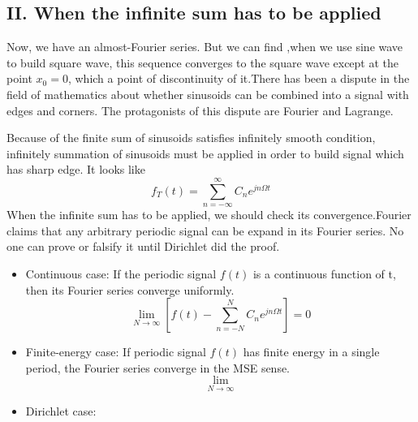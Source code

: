 \documentclass[margin,line]{res}
\begin{document}
\begin{resume}
\section{\sc II. When the infinite sum has to be applied}
Now, we have an almost-Fourier series. But we can find ,when we use sine wave to build square wave, this sequence converges to the square wave except at the point $x_0 = 0$, which a point of discontinuity of it.There has been a dispute in the field of mathematics about whether sinusoids can be combined into a signal with edges and corners. The protagonists of this dispute are Fourier and Lagrange. \par
Because of the finite sum of sinusoids satisfies infinitely smooth condition, infinitely summation of sinusoids must be applied in order to build signal which has sharp edge. It looks like 
$$
f_T(t) = \sum\limits_{n=-\infty}^{\infty} {C_n e^{jn\Omega t}}
$$
When the infinite sum has to be applied, we should check its convergence.Fourier claims that any arbitrary periodic signal can be expand in its Fourier series. No one can prove or falsify it until Dirichlet did the proof. \par

\begin{itemize}
\item Continuous case: If the periodic signal $f(t)$ is a continuous function of t, then its Fourier series converge uniformly.
$$
\lim_{N \rightarrow \infty} \left[ f(t) - \sum\limits_{n=-N}^{N}{C_n e^{jn\Omega t}} \right] = 0
$$
\item Finite-energy case: If periodic signal $f(t)$ has finite energy in a single period, the Fourier series converge in the MSE sense.
$$
\lim_{N \rightarrow \infty} 
$$
\item Dirichlet case:
\end{itemize}


\end{resume}
\end{document}
